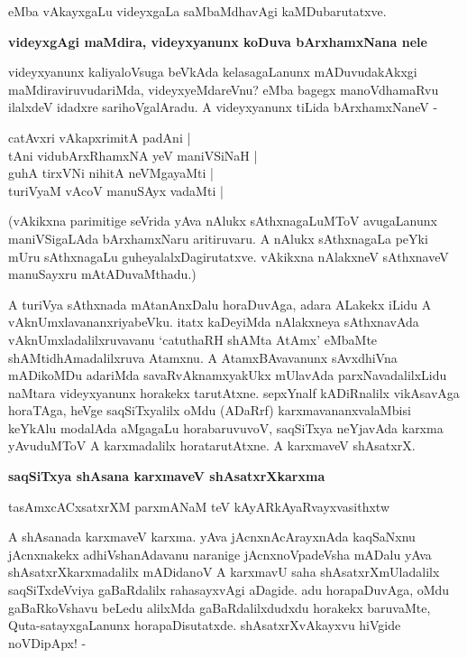 \noindent
eMba vAkayxgaLu videyxgaLa saMbaMdhavAgi kaMDubarutatxve.

{\bigskip
\noindent
{\large\bf videyxgAgi maMdira, videyxyanunx koDuva bArxhamxNana nele}}\label{page86a}
\medskip

\noindent
videyxyanunx kaliyaloVsuga beVkAda kelasagaLanunx mADuvudakAkxgi maMdiraviruvudariMda, videyxyeMdareVnu? eMba bagegx manoVdhamaRvu ilalxdeV idadxre sarihoVgalAradu. A videyxyanunx tiLida bArxhamxNaneV - 

\begin{shloka}
catAvxri vAkapxrimitA padAni |\\\label{86g}
tAni vidubArxRhamxNA yeV maniVSiNaH |\\
guhA tirxVNi nihitA neVMgayaMti |\\
turiVyaM vAcoV manuSAyx vadaMti |
\end{shloka}

\noindent
(vAkikxna parimitige seVrida yAva nAlukx sAthxnagaLuMToV avugaLanunx maniVSigaLAda bArxhamxNaru aritiruvaru. A nAlukx sAthxnagaLa peYki mUru sAthxnagaLu guheyalalxDagirutatxve. vAkikxna nAlakxneV sAthxnaveV manuSayxru mAtADuvaMthadu.) 

A turiVya sAthxnada mAtanAnxDalu horaDuvAga, adara ALakekx iLidu A vAknUmxlavananxriyabeVku. itatx kaDeyiMda nAlakxneya sAthxnavAda vAknUmxladalilxruvavanu `catuthaRH shAMta AtAmx' eMbaMte shAMtidhAmadalilxruva Atamxnu. A AtamxBAvavanunx sAvxdhiVna mADikoMDu adariMda savaRvAknamxyakUkx mUlavAda parxNavadalilxLidu naMtara videyxyanunx horakekx tarutAtxne. sepxYnalf kADiRnalilx vikAsavAga horaTAga, heVge saqSiTxyalilx oMdu (ADaRrf) karxmavananxvalaMbisi keYkAlu modalAda aMgagaLu horabaruvuvoV, saqSiTxya neYjavAda karxma yAvuduMToV A karxmadalilx horatarutAtxne. A karxmaveV shAsatxrX.

{\bigskip
\noindent
{\large\bf saqSiTxya shAsana karxmaveV shAsatxrXkarxma}}\label{page87}
\smallskip

\begin{shloka}
tasAmxcACxsatxrXM parxmANaM teV kAyARkAyaRvayxvasithxtw\label{87}
\end{shloka}

\noindent
A shAsanada karxmaveV karxma. yAva jAcnxnAcArayxnAda kaqSaNxnu jAcnxnakekx adhiVshanAdavanu naranige jAcnxnoVpadeVsha mADalu yAva shAsatxrXkarxmadalilx mADidanoV A karxmavU saha shAsatxrXmUladalilx saqSiTxdeVviya gaBaRdalilx rahasayxvAgi aDagide. adu horapaDuvAga, oMdu gaBaRkoVshavu beLedu alilxMda gaBaRdalilxdudxdu horakekx baruvaMte, Quta-satayxgaLanunx horapaDisutatxde. shAsatxrXvAkayxvu hiVgide noVDipApx! - 

